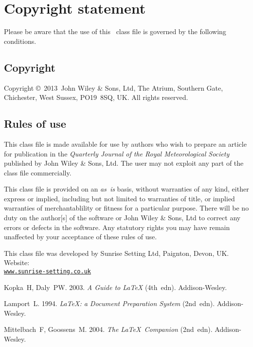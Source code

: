 \documentclass[times]{qjrms4}
\def\volumeyear{2013}
\begin{document}
\section{Copyright statement}
Please  be  aware that the use of  this \LaTeXe\ class file is
governed by the following conditions.

\subsection{Copyright}
Copyright \copyright\ \volumeyear\ John Wiley \& Sons, Ltd, The Atrium,
Southern Gate, Chichester, West Sussex, PO19~8SQ, UK.  All rights reserved.

\subsection{Rules of use}
This class file is made available for use by authors who wish to
prepare an article for publication in the \emph{Quarterly Journal
of the Royal Meteorological Society} published by John Wiley \&
Sons, Ltd.  The user may not exploit any part of the class file
commercially.

This class file is provided on an \emph{as~is}  basis, without
warranties of any kind, either express or implied, including but
not limited to warranties of title, or implied  warranties of
merchantablility or fitness for a particular purpose. There will
be no duty on the author[s] of the software or  John Wiley \&
Sons, Ltd to correct any errors or defects in the software. Any
statutory  rights you may have remain unaffected by your
acceptance of these rules of use.

\ack This class file was developed by Sunrise Setting Ltd,
Paignton, Devon, UK. Website:\\
\href{http://www.sunrise-setting.co.uk}{\texttt{www.sunrise-setting.co.uk}}

\begin{thebibliography}{99}
Kopka~H, Daly~PW. 2003. \emph{A Guide to \LaTeX} (4th~edn).
Addison-Wesley.

Lamport~L. 1994. \emph{\LaTeX: a Document Preparation System}
(2nd~edn). Addison-Wesley.

Mittelbach~F, Goossens~M. 2004. \emph{The \LaTeX\ Companion}
(2nd~edn). Addison-Wesley.

\end{thebibliography}
\end{document}

